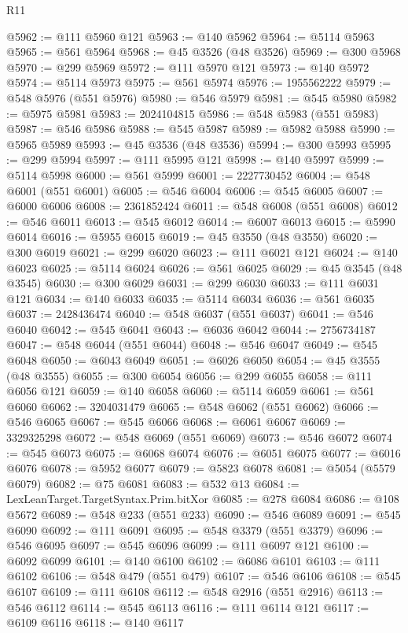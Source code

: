 \begin{lexlean}{R11}
\begin{coremodule}
@5962 := @111 @5960 @121
@5963 := @140 @5962
@5964 := @5114 @5963
@5965 := @561 @5964
@5968 := @45 @3526 (@48 @3526)
@5969 := @300 @5968
@5970 := @299 @5969
@5972 := @111 @5970 @121
@5973 := @140 @5972
@5974 := @5114 @5973
@5975 := @561 @5974
@5976 := 1955562222
@5979 := @548 @5976 (@551 @5976)
@5980 := @546 @5979
@5981 := @545 @5980
@5982 := @5975 @5981
@5983 := 2024104815
@5986 := @548 @5983 (@551 @5983)
@5987 := @546 @5986
@5988 := @545 @5987
@5989 := @5982 @5988
@5990 := @5965 @5989
@5993 := @45 @3536 (@48 @3536)
@5994 := @300 @5993
@5995 := @299 @5994
@5997 := @111 @5995 @121
@5998 := @140 @5997
@5999 := @5114 @5998
@6000 := @561 @5999
@6001 := 2227730452
@6004 := @548 @6001 (@551 @6001)
@6005 := @546 @6004
@6006 := @545 @6005
@6007 := @6000 @6006
@6008 := 2361852424
@6011 := @548 @6008 (@551 @6008)
@6012 := @546 @6011
@6013 := @545 @6012
@6014 := @6007 @6013
@6015 := @5990 @6014
@6016 := @5955 @6015
@6019 := @45 @3550 (@48 @3550)
@6020 := @300 @6019
@6021 := @299 @6020
@6023 := @111 @6021 @121
@6024 := @140 @6023
@6025 := @5114 @6024
@6026 := @561 @6025
@6029 := @45 @3545 (@48 @3545)
@6030 := @300 @6029
@6031 := @299 @6030
@6033 := @111 @6031 @121
@6034 := @140 @6033
@6035 := @5114 @6034
@6036 := @561 @6035
@6037 := 2428436474
@6040 := @548 @6037 (@551 @6037)
@6041 := @546 @6040
@6042 := @545 @6041
@6043 := @6036 @6042
@6044 := 2756734187
@6047 := @548 @6044 (@551 @6044)
@6048 := @546 @6047
@6049 := @545 @6048
@6050 := @6043 @6049
@6051 := @6026 @6050
@6054 := @45 @3555 (@48 @3555)
@6055 := @300 @6054
@6056 := @299 @6055
@6058 := @111 @6056 @121
@6059 := @140 @6058
@6060 := @5114 @6059
@6061 := @561 @6060
@6062 := 3204031479
@6065 := @548 @6062 (@551 @6062)
@6066 := @546 @6065
@6067 := @545 @6066
@6068 := @6061 @6067
@6069 := 3329325298
@6072 := @548 @6069 (@551 @6069)
@6073 := @546 @6072
@6074 := @545 @6073
@6075 := @6068 @6074
@6076 := @6051 @6075
@6077 := @6016 @6076
@6078 := @5952 @6077
@6079 := @5823 @6078
@6081 := @5054 (@5579 @6079)
@6082 := @75 @6081
@6083 := @532 @13
@6084 := LexLeanTarget.TargetSyntax.Prim.bitXor
@6085 := @278 @6084
@6086 := @108 @5672
@6089 := @548 @233 (@551 @233)
@6090 := @546 @6089
@6091 := @545 @6090
@6092 := @111 @6091
@6095 := @548 @3379 (@551 @3379)
@6096 := @546 @6095
@6097 := @545 @6096
@6099 := @111 @6097 @121
@6100 := @6092 @6099
@6101 := @140 @6100
@6102 := @6086 @6101
@6103 := @111 @6102
@6106 := @548 @479 (@551 @479)
@6107 := @546 @6106
@6108 := @545 @6107
@6109 := @111 @6108
@6112 := @548 @2916 (@551 @2916)
@6113 := @546 @6112
@6114 := @545 @6113
@6116 := @111 @6114 @121
@6117 := @6109 @6116
@6118 := @140 @6117

\end{coremodule}
\end{lexlean}
